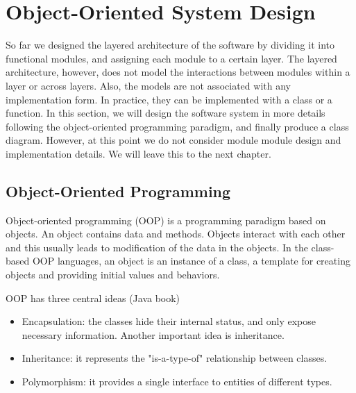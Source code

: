 \section{Object-Oriented System Design}
So far we designed the layered architecture of the software by dividing it into functional modules, and assigning each module to a certain layer. The layered architecture, however, does not model the interactions between modules within a layer or across layers. Also, the models are not associated with any implementation form. In practice, they can be implemented with a class or a function. In this section, we will design the software system in more details following the object-oriented programming paradigm, and finally produce a class diagram. However, at this point we do not consider module module design and implementation details. We will leave this to the next chapter.

\subsection{Object-Oriented Programming}
Object-oriented programming (OOP) is a programming paradigm based on objects. An object contains data and methods. Objects interact with each other and this usually leads to modification of the data in the objects. In the class-based OOP languages, an object is an instance of a class, a template for creating objects and providing initial values and behaviors. 

OOP has three central ideas (Java book)
\begin{itemize}
\item Encapsulation: the classes hide their internal status, and only expose necessary information. Another important idea is inheritance.
\item Inheritance: it represents the "is-a-type-of" relationship between classes.
\item Polymorphism: it provides a single interface to entities of different types.
\end{itemize}

